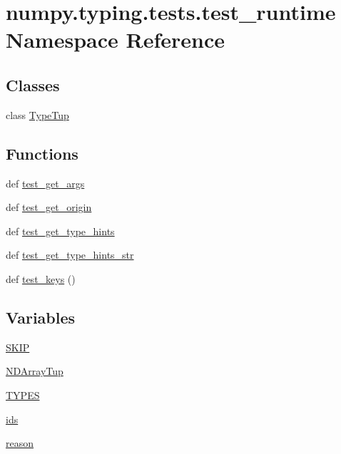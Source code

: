 \hypertarget{namespacenumpy_1_1typing_1_1tests_1_1test__runtime}{}\section{numpy.\+typing.\+tests.\+test\+\_\+runtime Namespace Reference}
\label{namespacenumpy_1_1typing_1_1tests_1_1test__runtime}
\subsection*{Classes}
\begin{DoxyCompactItemize}
\item 
class \hyperlink{classnumpy_1_1typing_1_1tests_1_1test__runtime_1_1TypeTup}{Type\+Tup}
\end{DoxyCompactItemize}
\subsection*{Functions}
\begin{DoxyCompactItemize}
\item 
def \hyperlink{namespacenumpy_1_1typing_1_1tests_1_1test__runtime_a767d025955051310f5a1d4a198d35b3a}{test\+\_\+get\+\_\+args}
\item 
def \hyperlink{namespacenumpy_1_1typing_1_1tests_1_1test__runtime_abfe868d1d4923f4ee912cd2920865975}{test\+\_\+get\+\_\+origin}
\item 
def \hyperlink{namespacenumpy_1_1typing_1_1tests_1_1test__runtime_a2607b2d1b024f0d55ee0bbd7037c5a29}{test\+\_\+get\+\_\+type\+\_\+hints}
\item 
def \hyperlink{namespacenumpy_1_1typing_1_1tests_1_1test__runtime_afe8b5c0d79700d6f29ba43b8d53bfac9}{test\+\_\+get\+\_\+type\+\_\+hints\+\_\+str}
\item 
def \hyperlink{namespacenumpy_1_1typing_1_1tests_1_1test__runtime_aa57cf261584816bb49f144ff1ead0a84}{test\+\_\+keys} ()
\end{DoxyCompactItemize}
\subsection*{Variables}
\begin{DoxyCompactItemize}
\item 
\hyperlink{namespacenumpy_1_1typing_1_1tests_1_1test__runtime_a691c383e4502431c41c974e333ec8121}{S\+K\+IP}
\item 
\hyperlink{namespacenumpy_1_1typing_1_1tests_1_1test__runtime_a4f4ebe4c032e3f10d716363f96d02446}{N\+D\+Array\+Tup}
\item 
\hyperlink{namespacenumpy_1_1typing_1_1tests_1_1test__runtime_a5ab82a412af8a0d0d3889a24fa32eb63}{T\+Y\+P\+ES}
\item 
\hyperlink{namespacenumpy_1_1typing_1_1tests_1_1test__runtime_ac0f92381eae53ca070d5b4727f19fb3c}{ids}
\item 
\hyperlink{namespacenumpy_1_1typing_1_1tests_1_1test__runtime_abf5cc989d129b2597ad847d57a6090da}{reason}
\end{DoxyCompactItemize}



